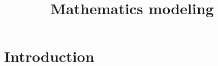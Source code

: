\documentclass{mcmthesis}
\title{Mathematics modeling}
\begin{document}
\tableofcontents
\thispagestyle{empty}
\newpage
\setcounter{page}{1}

\section{Introduction}
\end{document}
